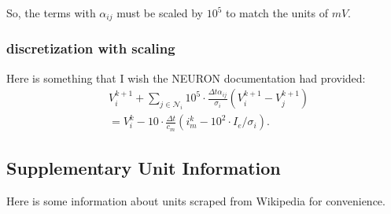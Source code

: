 So, the terms with $\alpha_{ij}$ must be scaled by $10^5$ to match the units of $mV$.
\subsubsection{discretization with scaling}
Here is something that I wish the NEURON documentation had provided:
\begin{align}
&     V_i^{k+1} + \sum_{j\in\mathcal{N}_i} {10^5 \cdot \frac{\Delta t \alpha_{ij}}{\sigma_i} (V_i^{k+1}-V_j^{k+1})} \nonumber \\
&   = V_i^k - 10\cdot \frac{\Delta t}{c_m}(i_m^{k} - 10^2\cdot I_e/\sigma_i).
\end{align}
\subsection{Supplementary Unit Information}
Here is some information about units scraped from Wikipedia for convenience.

